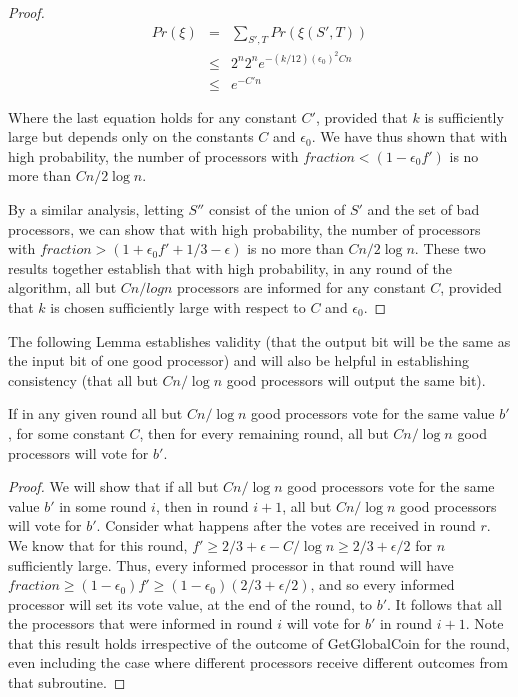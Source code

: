 \documentclass{sig-alternate}
\begin{document}
\begin{proof}
\begin{eqnarray*}
Pr (\xi) &= & \sum_{S',T} Pr(\xi(S',T)) \\
& \leq & 2^{n}2^{n}e^{-(k/12)(\epsilon_{0})^{2} C n} \\
& \leq & e^{-C' n}
\end{eqnarray*}

Where the last equation holds for any constant $C'$, provided that $k$ is sufficiently large but depends only on the constants $C$ and $\epsilon_{0}$.  We have thus shown that with high probability, the number of processors with $fraction < (1-\epsilon_{0} f')$ is no more than $C n/ 2\log n$.  

By a similar analysis, letting $S''$ consist of the union of $S'$ and the set of bad processors, we can show that with high probability, the number of processors with $fraction > (1+ \epsilon_{0} f' + 1/3 - \epsilon)$ is no more than $C n/ 2\log n$.  These two results together establish that with high probability, in any round of the algorithm, all but $Cn/ log n$ processors are informed for any constant $C$, provided that $k$ is chosen sufficiently large with respect to $C$ and $\epsilon_{0}$.
\end{proof}


The following Lemma establishes validity (that the output bit will be the same as the input bit of one good processor) and will also be helpful in establishing consistency (that all but $Cn/\log n$ good processors will output the same bit).

\begin{lemma} \label{l:validity}
If in any given round all but $Cn/\log n$ good processors vote for the same value $b'$, for some constant $C$, then for every remaining round, all but $Cn/ \log n$ good processors will vote for $b'$.
\end{lemma}

\begin{proof}
We will show that if all but $Cn/\log n$ good processors vote for the same value $b'$ in some round $i$, then in round $i+1$, all but $Cn/ \log n$ good processors will vote for $b'$.  Consider what happens after the votes are received in round $r$.  We know that for this round, $f' \geq 2/3 + \epsilon - C/ \log n \geq 2/3 + \epsilon/2$ for $n$ sufficiently large.  Thus, every informed processor in that round will have $fraction \geq (1-\epsilon_{0}) f' \geq (1-\epsilon_{0}) (2/3 + \epsilon/2)$, and so every informed processor will set its vote value, at the end of the round, to $b'$.  It follows that all the processors that were informed in round $i$ will vote for $b'$ in round $i+1$.  Note that this result holds irrespective of the outcome of GetGlobalCoin for the round, even including the case where different processors receive different outcomes from that subroutine.
\end{proof}
\end{document}
